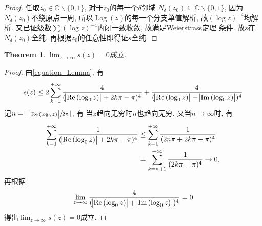 \documentclass[a4paper, 12pt]{ctexart}
\newtheorem{theorem}{Theorem}[section]
\theoremstyle{plain}
\theoremstyle{plain}
\theoremstyle{plain}
\theoremstyle{nonumberplain}
\newtheorem{proof}{Proof}
\DeclareMathOperator{\Log}{Log}
\DeclareMathOperator{\real}{Re}
\DeclareMathOperator{\image}{Im}
\begin{document}
    \begin{proof}
        任取$z_{0}\in\mathbb{C}\backslash\{0, 1\}$,
        对于$z_{0}$的每一个$\delta$邻域
        $N_{\delta}(z_{0})\subseteq\mathbb{C}\backslash\{0, 1\}$,
        因为$N_{\delta}(z_{0})$不绕原点一周,
        所以$\Log(z)$的每一个分支单值解析,
        故$(\log{z})^{-4}$均解析.
        又已证级数$\sum{(\log{z})^{-4}}$内闭一致收敛, 故满足Weierstrass定理
        条件. 故$s$在$N_{\delta}(z_{0})$全纯. 再根据$z_{0}$的任意性即得证$s$全纯.
    \end{proof}

    \begin{theorem}
        $\displaystyle \lim_{z\to\infty}{s(z)}=0$成立.
    \end{theorem}

    \begin{proof}
        由\ref{equation_Lemma}, 有
        \begin{equation}
            s(z) \leq 2\sum_{k=1}^{+\infty}{
                \frac{4}{(\abs{\real{(\log_{0}{z})}}+2k\pi-\pi)^{4}}}
                +\frac{4}{(\abs{\real{(\log_{0}{z})}}
                  +\abs{\image{(\log_{0}{z})}})^{4}}
        \end{equation}
        记$n=\lfloor \sfrac{\abs{\real{(\log_{0}{z})}}}{2\pi}\rfloor$, 有
        当$z$趋向无穷时$n$也趋向无穷. 又当$n\to\infty$时, 有
        \begin{equation}
        \begin{aligned}
            \sum_{k=1}^{+\infty}{
                \frac{1}{(\abs{\real{(\log_{0}{z})}}+2k\pi-\pi)^{4}}}
            &\leq
            \sum_{k=1}^{+\infty}{\frac{1}{(2n\pi+2k\pi-\pi)^{4}}}\\
            &=
            \sum_{k=n+1}^{+\infty}{\frac{1}{(2k\pi-\pi)^{4}}}
            \to 0.
        \end{aligned}
        \end{equation}
        再根据
        \begin{equation}
            \lim_{z\to\infty}{\frac{4}{(\abs{\real{(\log_{0}{z})}}
              +\abs{\image{(\log_{0}{z})}})^{4}}} = 0
        \end{equation}
        得出$\displaystyle \lim_{z\to\infty}{s(z)}=0$成立.
    \end{proof}


\end{document}
